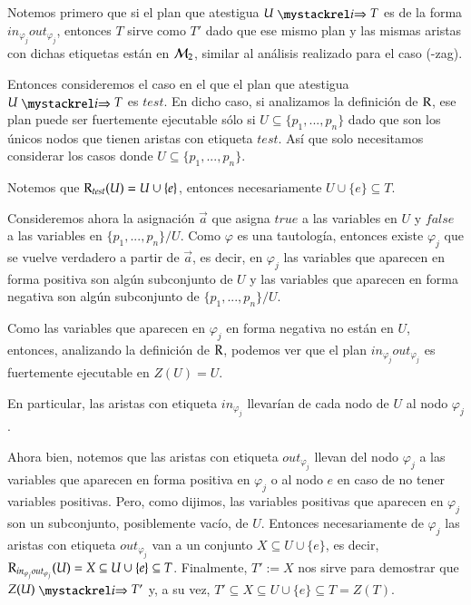 \begin{demostracion}
\begin{itemize}
    Notemos primero que si el plan que atestigua $U \ultsExecAgi T$ es de la forma $in_{\varphi_j}out_{\varphi_j}$, 
    entonces $T$ sirve como $T'$ dado que ese mismo plan y las mismas aristas con dichas etiquetas están en $\mathcal{M}_2$, 
    similar al análisis realizado para el caso (\KHilogic-zag).

    Entonces consideremos el caso en el que el plan que atestigua $U \ultsExecAgi T$ es $test$. En dicho caso, 
    si analizamos la definición de $\mathrm{R}$, ese plan puede ser fuertemente ejecutable sólo si $U \subseteq \{p_1,...,p_n\}$ 
    dado que son los únicos nodos que tienen aristas con etiqueta $test$. Así que solo necesitamos considerar los casos 
    donde $U \subseteq \{p_1,...,p_n\}$.

    Notemos que $\mathrm{R}_{test}(U) = U \cup \{e\}$, entonces necesariamente $U \cup \{e\} \subseteq T$.

    Consideremos ahora la asignación $\overrightarrow{a}$ que asigna $true$ a las variables en $U$ y $false$ a las variables 
    en $\{p_1,...,p_n\} / U$. Como $\varphi$ es una tautología, entonces existe $\varphi_j$ que se vuelve verdadero a partir 
    de $\overrightarrow{a}$, es decir, en $\varphi_j$ las variables que aparecen en forma positiva son algún subconjunto de 
    $U$ y las variables que aparecen en forma negativa son algún subconjunto de $\{p_1,...,p_n\}/U$.

    Como las variables que aparecen en $\varphi_j$ en forma negativa no están en $U$, entonces, analizando la definición de $\mathrm{R}$, 
    podemos ver que el plan $in_{\varphi_j}out_{\varphi_j}$ es fuertemente ejecutable en $Z(U) = U$. 
    
    En particular, las aristas con etiqueta $in_{\varphi_j}$ llevarían de cada nodo de $U$ al nodo $\varphi_j$.
    
    Ahora bien, notemos que las aristas con etiqueta $out_{\varphi_j}$ llevan del nodo $\varphi_j$ a las variables 
    que aparecen en forma positiva en $\varphi_j$ o al nodo $e$ en caso de no tener variables positivas. Pero, como dijimos, 
    las variables positivas que aparecen en $\varphi_j$ son un subconjunto, posiblemente vacío, de $U$. 
    Entonces necesariamente de $\varphi_j$ las aristas con etiqueta $out_{\varphi_j}$ van a un conjunto $X \subseteq U \cup \{e\}$, 
    es decir, $\mathrm{R}_{in_{\varphi_j}out_{\varphi_j}}(U) = X \subseteq U \cup \{e\} \subseteq T$. 
    Finalmente, $T' := X$ nos sirve para demostrar que $Z(U) \ultsExecAgi T'$ y, a su vez, 
    $T' \subseteq X \subseteq U \cup \{e\} \subseteq T = Z(T)$.


\end{itemize}
\end{demostracion}
